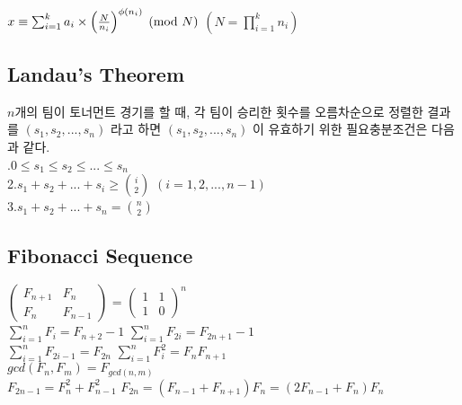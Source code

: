 \documentclass[10pt,landscape,a4paper,twocolumn]{article}
\begin{document}
\begin{large}
$x \equiv \sum_{i=1}^k {a_i\times{\left( {N \over n_i} \right)}^{\phi(n_i)}} \pmod{N}$ \hspace{1em} $\left( N = \prod_{i=1}^k {n_i} \right)$
\end{large}


\subsection{Landau's Theorem}
$n$개의 팀이 토너먼트 경기를 할 때, 각 팀이 승리한 횟수를 오름차순으로 정렬한 결과를 $(s_1,s_2, ... , s_n)$ 라고 하면 $(s_1,s_2, ... , s_n)$ 이 유효하기 위한 필요충분조건은 다음과 같다.\\
.\hspace{1em}$0 \le s_1 \le s_2 \le ... \le s_n$\\
2.\hspace{1em}$s_1+s_2+ ...+s_i \ge {i \choose 2}$ \hspace{1em}$(i=1,2,...,n-1)$\\
3.\hspace{1em}$s_1+s_2+ ...+s_n = {n \choose 2}$\\

\subsection{Fibonacci Sequence}
$
\begin{pmatrix}
    F_{n+1} & F_n \\
    F_n & F_{n-1}
\end{pmatrix}
$
=
$
\begin{pmatrix}
    1 & 1 \\
    1 & 0
\end{pmatrix}^n
$\\


$\sum_{i=1}^n F_i=F_{n+2}-1$
\hspace{10em}
$\sum_{i=1}^n F_{2i}=F_{2n+1}-1$\\

$\sum_{i=1}^n F_{2i-1}=F_{2n}$
\hspace{11em}
$\sum_{i=1}^n F_i^2=F_nF_{n+1}$\\

$gcd(F_n,F_m)=F_{gcd(n,m)}$\\

$F_{2n-1}=F_n^2+F_{n-1}^2$
\hspace{10em}
$F_{2n}=(F_{n-1}+F_{n+1})F_n=(2F_{n-1}+F_n)F_n$\\
\end{document}
